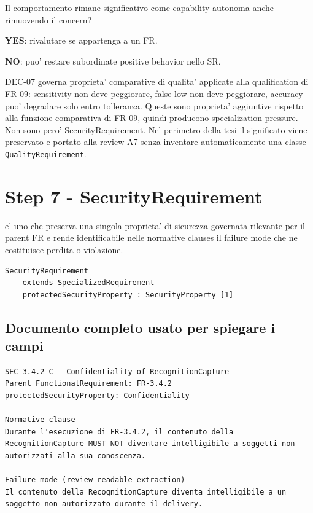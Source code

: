 \documentclass[11pt,a4paper]{article}
\begin{document}
\begin{ddtacheck}[title={Autonomous capability test}]
Il comportamento rimane significativo come capability autonoma anche rimuovendo il concern?\par
\textbf{YES}: rivalutare se appartenga a un FR.\par
\textbf{NO}: puo' restare subordinate positive behavior nello SR.
\end{ddtacheck}

\begin{ddtaexample}[title={DermaTriage DEC-07 - specialization pressure non-security}]
DEC-07 governa proprieta' comparative di qualita' applicate alla qualification di FR-09: sensitivity non deve peggiorare, false-low non deve peggiorare, accuracy puo' degradare solo entro tolleranza. Queste sono proprieta' aggiuntive rispetto alla funzione comparativa di FR-09, quindi producono specialization pressure. Non sono pero' SecurityRequirement. Nel perimetro della tesi il significato viene preservato e portato alla review A7 senza inventare automaticamente una classe \texttt{QualityRequirement}.
\end{ddtaexample}

\section{Step 7 - SecurityRequirement}
\closedtag

\SECR{} e' uno \SR{} che preserva una singola proprieta' di sicurezza governata rilevante per il parent FR e rende identificabile nelle normative clauses il failure mode che ne costituisce perdita o violazione.

\begin{lstlisting}
SecurityRequirement
    extends SpecializedRequirement
    protectedSecurityProperty : SecurityProperty [1]
\end{lstlisting}

\subsection{Documento completo usato per spiegare i campi}

\begin{ddtaexample}[title={Facial Access - SEC-3.4.2-C Confidentiality}]
\begin{lstlisting}
SEC-3.4.2-C - Confidentiality of RecognitionCapture
Parent FunctionalRequirement: FR-3.4.2
protectedSecurityProperty: Confidentiality

Normative clause
Durante l'esecuzione di FR-3.4.2, il contenuto della
RecognitionCapture MUST NOT diventare intelligibile a soggetti non
autorizzati alla sua conoscenza.

Failure mode (review-readable extraction)
Il contenuto della RecognitionCapture diventa intelligibile a un
soggetto non autorizzato durante il delivery.
\end{lstlisting}
\end{ddtaexample}
\end{document}

